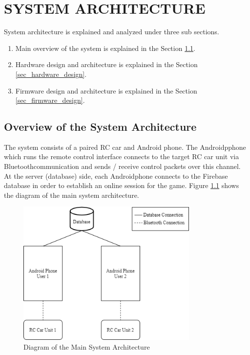 \chapter{SYSTEM ARCHITECTURE} \label{chap_sys_architecture}
System architecture is explained and analyzed under three sub sections.
\begin{enumerate}
    \item Main overview of the system is explained in the Section \ref{sec_overview_sys_architecture}.
    \item Hardware design and architecture is explained in the Section \ref{sec_hardware_design}.
    \item Firmware design and architecture is explained in the Section \ref{sec_firmware_design}.
\end{enumerate}

\section{Overview of the System Architecture} \label{sec_overview_sys_architecture}

The system consists of a paired RC car and Android phone. The Android\texttrademark\;pphone which runs the remote control interface connects to the target RC car unit via Bluetooth\texttrademark\;communication and sends / receive control packets over this channel. At the server (database) side, each Android\texttrademark\;phone connects to the Firebase database in order to establish an online session for the game. Figure \ref{fig:overview_architecture} shows the diagram of the main system architecture.

\begin{figure}[!htbp]
    \centering
    \includegraphics[width=0.8\textwidth]{Imgs/overview_of_sys.drawio.png}
    \caption{\label{fig:overview_architecture}Diagram of the Main System Architecture}
\end{figure}

